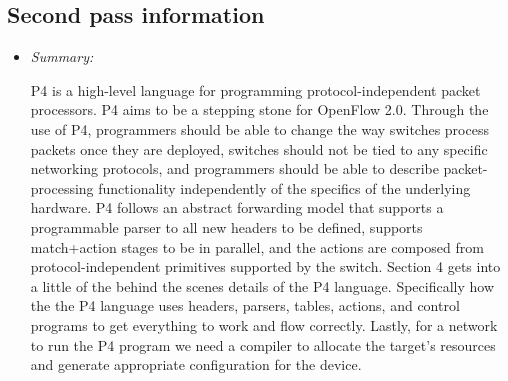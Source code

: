 \documentclass[letterpaper,twocolumn,10pt]{article}
\begin{document}
\subsection{Second pass information}
\label{sec:second}

\begin{itemize}

\item {\it Summary:} 

P4 is a high-level language for programming protocol-independent packet processors. P4 aims to be a stepping
stone for OpenFlow 2.0. Through the use of P4, programmers should be able to change the way switches process
packets once they are deployed, switches should not be tied to any specific networking protocols, and programmers
should be able to describe packet-processing functionality independently of the specifics of the underlying hardware. 
P4 follows an abstract forwarding model that supports a programmable parser to all new headers to be defined, supports
match+action stages to be in parallel, and the actions are composed from protocol-independent primitives supported by 
the switch. Section 4 gets into a little of the behind the scenes details of the P4 language. Specifically how the the P4 
language uses headers, parsers, tables, actions, and control programs to get everything to work and flow correctly.
Lastly, for a network to run the P4 program we need a compiler to allocate the target's resources and generate 
appropriate configuration for the device. 

\end{itemize}
\end{document}
